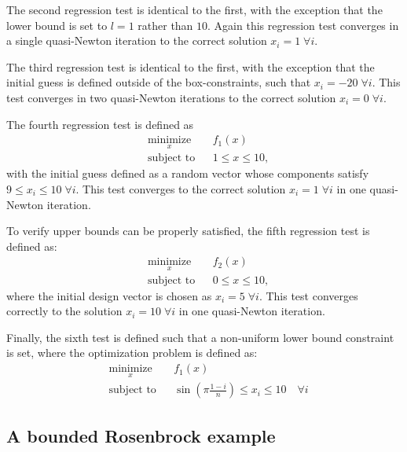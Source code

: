 \documentclass[11pt]{article}
\begin{document}
The second regression test is identical to the first,
with the exception that the lower bound is set to $l = 1$
rather than $10$. Again this regression test converges in a single
quasi-Newton iteration to the correct solution
$x_i = 1 \; \forall i$.

The third regression test is identical to the first,
with the exception that the initial guess is defined outside
of the box-constraints, such that $x_i = -20 \; \forall i$.
This test converges in two quasi-Newton iterations to the
correct solution $x_i = 0 \; \forall i$.

The fourth regression test is defined as
%
\begin{equation}
\begin{aligned}
& \underset{x}{\text{minimize}}
& & f_1(x) \\
& \text{subject to}
& & 1 \leq x \leq 10,
\end{aligned}
\end{equation}
%
with the initial guess defined as a random
vector whose components satisfy $9 \leq x_i \leq 10 \; \forall i$.
This test converges to the correct solution
$x_i = 1 \; \forall i$ in one quasi-Newton iteration.

To verify upper bounds can be properly satisfied, the
fifth regression test is defined as:
%
\begin{equation}
\begin{aligned}
& \underset{x}{\text{minimize}}
& & f_2(x) \\
& \text{subject to}
& & 0 \leq x \leq 10,
\end{aligned}
\end{equation}
%
where the initial design vector is chosen as
$x_i = 5 \; \forall i$. This test converges
correctly to the solution $x_i = 10 \; \forall i$
in one quasi-Newton iteration.

Finally, the sixth test is defined such that
a non-uniform lower bound constraint is set,
where the optimization problem is defined as:
\begin{equation}
\begin{aligned}
& \underset{x}{\text{minimize}}
& & f_1(x) \\
& \text{subject to}
& & \sin(\pi \frac{1-i}{n}) \leq x_i \leq 10  \quad \forall i
\end{aligned}
\end{equation}
%

\subsection{A bounded Rosenbrock example}
\end{document}
